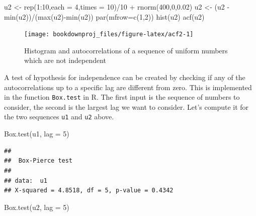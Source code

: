\documentclass[
]{book}
\newenvironment{Shaded}{\begin{snugshade}}{\end{snugshade}}
\newcommand{\AttributeTok}[1]{\textcolor[rgb]{0.77,0.63,0.00}{#1}}
\newcommand{\DecValTok}[1]{\textcolor[rgb]{0.00,0.00,0.81}{#1}}
\newcommand{\FloatTok}[1]{\textcolor[rgb]{0.00,0.00,0.81}{#1}}
\newcommand{\FunctionTok}[1]{\textcolor[rgb]{0.00,0.00,0.00}{#1}}
\newcommand{\NormalTok}[1]{#1}
\newcommand{\OtherTok}[1]{\textcolor[rgb]{0.56,0.35,0.01}{#1}}
\newcommand{\SpecialCharTok}[1]{\textcolor[rgb]{0.00,0.00,0.00}{#1}}
\theoremstyle{definition}
\theoremstyle{definition}
\theoremstyle{definition}
\theoremstyle{definition}
\theoremstyle{remark}
\begin{document}
\begin{Shaded}
\begin{Highlighting}[]
\NormalTok{u2 }\OtherTok{\textless{}{-}} \FunctionTok{rep}\NormalTok{(}\DecValTok{1}\SpecialCharTok{:}\DecValTok{10}\NormalTok{,}\AttributeTok{each =} \DecValTok{4}\NormalTok{,}\AttributeTok{times =} \DecValTok{10}\NormalTok{)}\SpecialCharTok{/}\DecValTok{10} \SpecialCharTok{+} \FunctionTok{rnorm}\NormalTok{(}\DecValTok{400}\NormalTok{,}\DecValTok{0}\NormalTok{,}\FloatTok{0.02}\NormalTok{) }
\NormalTok{u2 }\OtherTok{\textless{}{-}}\NormalTok{ (u2 }\SpecialCharTok{{-}} \FunctionTok{min}\NormalTok{(u2))}\SpecialCharTok{/}\NormalTok{(}\FunctionTok{max}\NormalTok{(u2)}\SpecialCharTok{{-}}\FunctionTok{min}\NormalTok{(u2))}
\FunctionTok{par}\NormalTok{(}\AttributeTok{mfrow=}\FunctionTok{c}\NormalTok{(}\DecValTok{1}\NormalTok{,}\DecValTok{2}\NormalTok{))}
\FunctionTok{hist}\NormalTok{(u2)}
\FunctionTok{acf}\NormalTok{(u2)}
\end{Highlighting}
\end{Shaded}

\begin{figure}

{\centering \texttt{[image: bookdownproj\_files/figure-latex/acf2-1]} 

}

\caption{Histogram and autocorrelations of a sequence of uniform numbers which are not independent}\label{fig:acf2}
\end{figure}

A test of hypothesis for independence can be created by checking if any of the autocorrelations up to a specific lag are different from zero. This is implemented in the function \texttt{Box.test} in R. The first input is the sequence of numbers to consider, the second is the largest lag we want to consider. Let's compute it for the two sequences \texttt{u1} and \texttt{u2} above.

\begin{Shaded}
\begin{Highlighting}[]
\FunctionTok{Box.test}\NormalTok{(u1, }\AttributeTok{lag =} \DecValTok{5}\NormalTok{)}
\end{Highlighting}
\end{Shaded}

\begin{verbatim}
## 
##  Box-Pierce test
## 
## data:  u1
## X-squared = 4.8518, df = 5, p-value = 0.4342
\end{verbatim}

\begin{Shaded}
\begin{Highlighting}[]
\FunctionTok{Box.test}\NormalTok{(u2, }\AttributeTok{lag =} \DecValTok{5}\NormalTok{)}
\end{Highlighting}
\end{Shaded}
\end{document}
